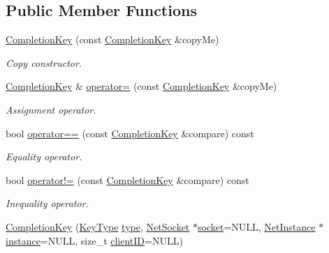\subsection*{Public Member Functions}
\begin{DoxyCompactItemize}
\item 
\hyperlink{class_completion_key_a08c67ff59ddc8704d3e21373a27155b9}{CompletionKey} (const \hyperlink{class_completion_key}{CompletionKey} \&copyMe)
\begin{DoxyCompactList}\small\item\em Copy constructor. \item\end{DoxyCompactList}\item 
\hyperlink{class_completion_key}{CompletionKey} \& \hyperlink{class_completion_key_ad544e6e2d72865351c09e77166633424}{operator=} (const \hyperlink{class_completion_key}{CompletionKey} \&copyMe)
\begin{DoxyCompactList}\small\item\em Assignment operator. \item\end{DoxyCompactList}\item 
bool \hyperlink{class_completion_key_a51628dbd9aca436ef191d7eef2a60487}{operator==} (const \hyperlink{class_completion_key}{CompletionKey} \&compare) const 
\begin{DoxyCompactList}\small\item\em Equality operator. \item\end{DoxyCompactList}\item 
bool \hyperlink{class_completion_key_aaaabca93c940e464338e85c523980c0c}{operator!=} (const \hyperlink{class_completion_key}{CompletionKey} \&compare) const 
\begin{DoxyCompactList}\small\item\em Inequality operator. \item\end{DoxyCompactList}\item 
\hyperlink{class_completion_key_a0b3139b955f8c725a7d41a603b0dcb32}{CompletionKey} (\hyperlink{class_completion_key_ad0789e8ca951edd8ee5b1b2fb7cdd8b4}{KeyType} \hyperlink{class_completion_key_a9baa44ea64d0e6b40e8863b1f4d6c2dd}{type}, \hyperlink{class_net_socket}{NetSocket} $\ast$\hyperlink{class_completion_key_a277a71c81d700138d73fb918c41ee8e2}{socket}=NULL, \hyperlink{class_net_instance}{NetInstance} $\ast$\hyperlink{class_completion_key_a56e795d930e82555049fbf97c82f6493}{instance}=NULL, size\_\-t \hyperlink{class_completion_key_ae434a173023d23d9cc22b131509d0325}{clientID}=NULL)

\end{DoxyCompactItemize}
